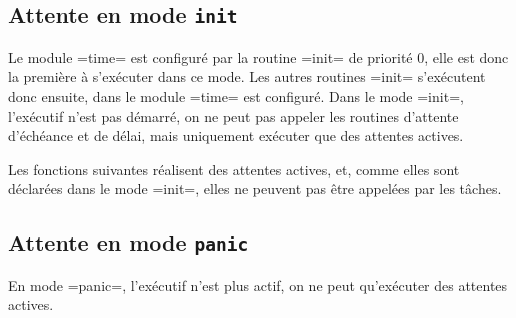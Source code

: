 
\subsection{Attente en mode \texttt{init}}

Le module \plm=time= est configuré par la routine \plm=init= de priorité $0$, elle est donc la première à s'exécuter dans ce mode. Les autres routines \plm=init= s'exécutent donc ensuite, dans le module \plm=time= est configuré. Dans le mode \plm=init=, l'exécutif n'est pas démarré, on ne peut pas appeler les routines d'attente d'échéance et de délai, mais uniquement exécuter que des attentes actives.

Les fonctions suivantes réalisent des attentes actives, et, comme elles sont déclarées dans le mode \plm=init=, elles ne peuvent pas être appelées par les tâches.




\subsection{Attente en mode \texttt{panic}}

En mode \plm=panic=, l'exécutif n'est plus actif, on ne peut qu'exécuter des attentes actives.














